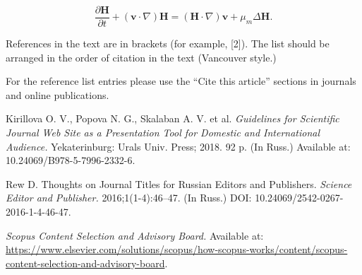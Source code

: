 \documentclass[12pt]{report}
\begin{document}
\begin{equation} \label{eq:Cheb19SurMathGalkin__1_} 
\frac{\partial \textbf{H}}{\partial t} +\left(\textbf{v}\cdot \nabla \right)\textbf{H}=\left(\textbf{H}\cdot \nabla \right)\textbf{v}+\mu _{m} \Delta \textbf{H}.
\end{equation} 

References in the text are in brackets (for example, [2]). The list should be arranged in the order of citation in the text (Vancouver style.)

For the reference list entries please use the ``Cite this article'' sections in journals and online publications. 



\begin{thebibliography}{9}

Kirillova O. V., Popova N. G., Skalaban A. V. et al. \textit{Guidelines for Scientific Journal Web Site as a Presentation Tool for Domestic and International Audience.} Yekaterinburg: Urals Univ. Press; 2018. 92 p. (In Russ.) Available at: 10.24069/B978-5-7996-2332-6.

Rew D. Thoughts on Journal Titles for Russian Editors and Publishers. \textit{Science Editor and Publisher.} 2016;1(1-4):46–47. (In Russ.) DOI: 10.24069/2542-0267-2016-1-4-46-47.

\textit{Scopus Content Selection and Advisory Board.} Available at: \url{https://www.elsevier.com/solutions/scopus/how-scopus-works/content/scopus-content-selection-and-advisory-board}.

\end{thebibliography}
\end{document}
